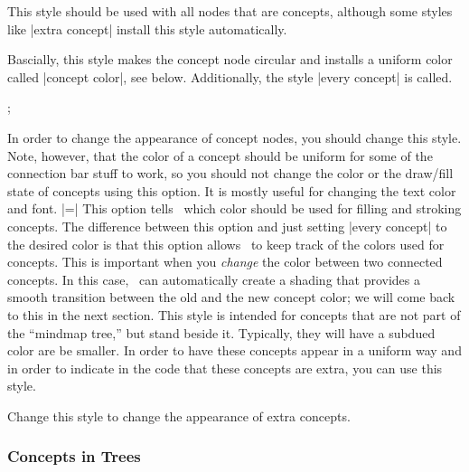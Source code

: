 \begin{itemize}
  This style should be used with all nodes that are concepts, although
  some styles like |extra concept| install this style automatically.

  Bascially, this style makes the concept node circular and installs a
  uniform color called |concept color|, see below. Additionally, the
  style |every concept| is called.
\begin{codeexample}[]
\tikz[mindmap,concept color=red!50] ;
\end{codeexample}
  In order to change the appearance of concept nodes, you should
  change this style. Note, however, that the color of a concept should
  be uniform for some of the connection bar stuff to work, so you
  should not change the color or the draw/fill state of concepts using
  this option. It is mostly useful for changing the text color and
  font.
  |=|
  This option tells \tikzname\ which color should be used for filling
  and stroking concepts. The difference between this option and just
  setting |every concept| to the desired color is that this option
  allows \tikzname\ to keep track of the colors used for
  concepts. This is important when you \emph{change} the color between
  two connected concepts. In this case, \tikzname\ can automatically
  create a shading that provides a smooth transition between the old
  and the new concept color; we will come back to this in the next
  section. 
  This style is intended for concepts that are not part of the
  ``mindmap tree,'' but stand beside it. Typically, they will have a
  subdued color are be smaller. In order to have these concepts appear
  in a uniform way and in order to indicate in the code that these
  concepts are extra, you can use this style.
\begin{codeexample}[]
\end{codeexample}
  Change this style to change the appearance of extra concepts.
\end{itemize}


\subsubsection{Concepts in Trees}


